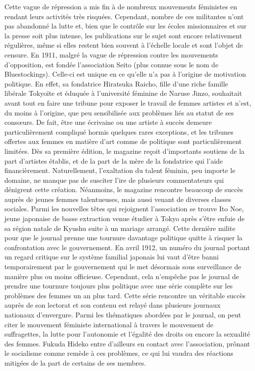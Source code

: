 \documentclass[11pt,a4paper]{article}
\begin{document}
Cette vague de répression a mis fin à de nombreux mouvements féministes en rendant leurs activités très risquées. Cependant, nombre de ces militantes n’ont pas abandonné la lutte et, bien que le contrôle sur les écoles missionnaires et sur la presse soit plus intense, les publications sur le sujet sont encore relativement régulières, même si elles restent bien souvent à l’échelle locale et sont l’objet de censure. En 1911, malgré la vague de répression contre les mouvements d’opposition, est fondée l’association Seito (plus connue sous le nom de Bluestockings). Celle-ci est unique en ce qu’elle n’a pas à l’origine de motivation politique. En effet, sa fondatrice Hiratsuka Raicho, fille d’une riche famille libérale Tokyoïte et éduquée à l’université féminine de Naruse Jinzo, souhaitait avant tout en faire une tribune pour exposer le travail de femmes artistes et n’est, du moins à l’origine, que peu sensibilisée aux problèmes liés au statut de ses consœurs. De fait, être une écrivaine ou une artiste à succès demeure particulièrement compliqué hormis quelques rares exceptions, et les tribunes offertes aux femmes en matière d’art comme de politique sont particulièrement limitées. Dès sa première édition, le magazine reçoit d'importants soutiens de la part d’artistes établis, et de la part de la mère de la fondatrice qui l’aide financièrement. Naturellement, l’exaltation du talent féminin, peu importe le domaine, ne manque pas de susciter l’ire de plusieurs commentateurs qui dénigrent cette création. Néanmoins, le magazine rencontre beaucoup de succès auprès de jeunes femmes talentueuses, mais aussi venant de diverses classes sociales. Parmi les nouvelles têtes qui rejoignent l’association se trouve Ito Noe, jeune japonaise de basse extraction venue étudier à Tokyo après s’être enfuie de sa région natale de Kyushu suite à un mariage arrangé. Cette dernière milite pour que le journal prenne une tournure davantage politique quitte à risquer la confrontation avec le gouvernement. En avril 1912, un numéro du journal portant un regard critique sur le système familial japonais lui vaut d’être banni temporairement par le gouvernement qui le met désormais sous surveillance de manière plus ou moins officieuse. Cependant, cela n'empêche pas le journal de prendre une tournure toujours plus politique avec une série complète sur les problèmes des femmes un an plus tard. Cette série rencontre un véritable succès auprès de son lectorat et son contenu est relayé dans plusieurs journaux nationaux d’envergure. Parmi les thématiques abordées par le journal, on peut citer le mouvement féministe international à travers le mouvement de suffragettes, la lutte pour l’autonomie et l’égalité des droits ou encore la sexualité des femmes. Fukuda Hideko entre d’ailleurs en contact avec l’association, prônant le socialisme comme remède à ces problèmes, ce qui lui vaudra des réactions mitigées de la part de certains de ses membres.
\end{document}
